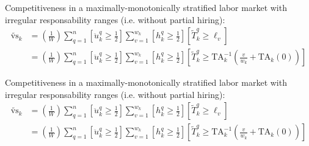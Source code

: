 \documentclass[hidelinks, nonatbib]{elsarticle}
\begin{document}
Competitiveness in a maximally-monotonically stratified labor market with irregular responsability ranges (i.e. without partial hiring):
\begin{align}
    \tilde{\text{vs}}_k 
    &=
    \left(
        \frac{1}{W}
    \right)
    \sum_{q=1}^{n}
    \left[
        \ddot{u}_{k}^{q}
        \geq
        \frac{1}{2}
    \right]
    \sum_{v=1}^{w_k}
    \left[
        h_{k}^{q}
        \geq
        \frac{1}{2}
    \right]
    \left[
        \tilde{T}_{k}^{q}
        \geq
        \ell_v
    \right]
    \\
    &=
    \left(
        \frac{1}{W}
    \right)
    \sum_{q=1}^{n}
    \left[
        \ddot{u}_{k}^{q}
        \geq
        \frac{1}{2}
    \right]
    \sum_{v=1}^{w_k}
    \left[
        h_{k}^{q}
        \geq
        \frac{1}{2}
    \right]
    \left[
        \tilde{T}_{k}^{q}
        \geq
        \text{TA}_{k}^{-1}
        \left(
            \frac{v}{w_k}
            +
            \text{TA}_{k}(0)
        \right)
    \right]
\end{align}


Competitiveness in a maximally-monotonically stratified labor market with irregular responsability ranges (i.e. without partial hiring):
\begin{align}
    \tilde{\text{vs}}_k 
    &=
    \left(
        \frac{1}{W}
    \right)
    \sum_{q=1}^{n}
    \left[
        \ddot{u}_{k}^{q}
        \geq
        \frac{1}{2}
    \right]
    \sum_{v=1}^{w_k}
    \left[
        h_{k}^{q}
        \geq
        \frac{1}{2}
    \right]
    \left[
        \tilde{T}_{k}^{q}
        \geq
        \ell_v
    \right]
    \\
    &=
    \left(
        \frac{1}{W}
    \right)
    \sum_{q=1}^{n}
    \left[
        \ddot{u}_{k}^{q}
        \geq
        \frac{1}{2}
    \right]
    \sum_{v=1}^{w_k}
    \left[
        h_{k}^{q}
        \geq
        \frac{1}{2}
    \right]
    \left[
        \tilde{T}_{k}^{q}
        \geq
        \text{TA}_{k}^{-1}
        \left(
            \frac{v}{w_k}
            +
            \text{TA}_{k}(0)
        \right)
    \right]
\end{align}
\end{document}
